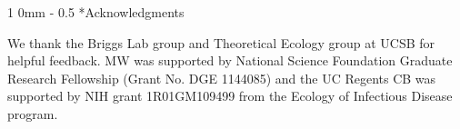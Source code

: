\documentclass[12pt, a4paper]{article}
\makeatletter
\renewcommand{\section}{\@startsection
{section}%
{1}%
{0mm}%
{-\baselineskip}%
{0.5\baselineskip}%
{\normalfont\bf\large}} %
\makeatother
\begin{document}
\section*{Acknowledgments}

We thank the Briggs Lab group and Theoretical Ecology group at UCSB for helpful feedback.  MW was supported by National Science Foundation Graduate Research Fellowship (Grant No. DGE 1144085) and the UC Regents CB was supported by NIH grant 1R01GM109499 from the Ecology of Infectious Disease program.



\singlespacing



\newpage




\end{document}
